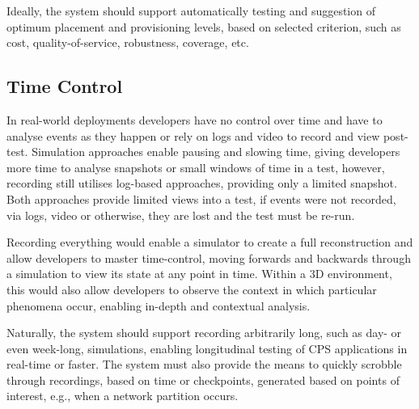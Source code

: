 Ideally, the system should support automatically testing and suggestion of optimum placement and provisioning levels, based on selected criterion, such as cost, quality-of-service, robustness, coverage, etc.






\subsection{Time Control}
\label{sub:requirements_Time Control}
In real-world deployments developers have no control over time and have to analyse events as they happen or rely on logs and video to record and view post-test. Simulation approaches enable pausing and slowing time, giving developers more time to analyse snapshots or small windows of time in a test, however, recording still utilises log-based approaches, providing only a limited snapshot. Both approaches provide limited views into a test, if events were not recorded, via logs, video or otherwise, they are lost and the test must be re-run.

Recording everything would enable a simulator to create a full reconstruction and allow developers to master time-control, moving forwards and backwards through a simulation to view its state at any point in time. Within a 3D environment, this would also allow developers to observe the context in which particular phenomena occur, enabling in-depth and contextual analysis.

Naturally, the system should support recording arbitrarily long, such as day- or even week-long, simulations, enabling longitudinal testing of CPS applications in real-time or faster. The system must also provide the means to quickly scrobble through recordings, based on time or checkpoints, generated based on points of interest, e.g., when a network partition occurs.


